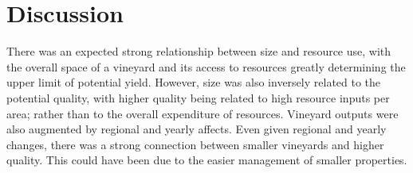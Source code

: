 \documentclass[review,12pt,authoryear]{elsarticle}
\begin{document}
\begin{linenumbers}
\begin{table}[]
  \label{tab:kfold}
  \caption{Model validation using k-fold cross validation, for 10 folds repeated 100 times.}
  \end{table}

\section{Discussion}
There was an expected strong relationship between size and resource use, with the overall space of a vineyard and its access to resources greatly determining the upper limit of potential yield. However, size was also inversely related to the potential quality, with higher quality being related to high resource inputs per area; rather than to the overall expenditure of resources. Vineyard outputs were also augmented by regional and yearly affects. Even given regional and yearly changes, there was a strong connection between smaller vineyards and higher quality. This could have been due to the easier management of smaller properties.

\end{linenumbers}
\end{document}
